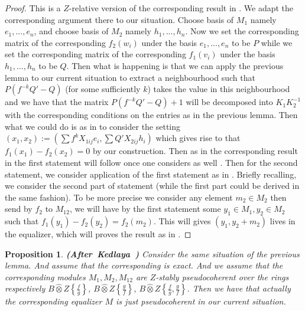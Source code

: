 \documentclass[12pt]{amsart}
\newtheorem{proposition}[theorem]{Proposition}
\theoremstyle{definition}
\numberwithin{equation}{section}
\begin{document}
\begin{proof}
This is a $Z$-relative version of the corresponding result in \cite[Lemma 1.9.10]{Ked2}. We adapt the corresponding argument there to our situation. Choose basis of $M_1$ namely $e_1,...,e_n$, and choose basis of $M_2$ namely $h_1,...,h_n$. Now we set the corresponding matrix of the corresponding $f_2(w_i)$ under the basis $e_1,...,e_n$ to be $P$ while we set the corresponding matrix of the corresponding $f_1(v_i)$ under the basis $h_1,...,h_n$ to be $Q$. Then what is happening is that we can apply the previous lemma to our current situation to extract a neighbourhood such that $P(f^{-k}Q'-Q)$ (for some sufficiently $k$) takes the value in this neighbourhood and we have that the matrix $P(f^{-k}Q'-Q)+1$ will be decomposed into $K_1K_2^{-1}$ with the corresponding conditions on the entries as in the previous lemma. Then what we could do is as in \cite[Lemma 1.9.10]{Ked2} to consider the setting $(x_1,x_2):=(\sum f^kX_{1ij}e_i,\sum Q'X_{2ij}h_i)$ which gives rise to that $f_1(x_1)-f_2(x_2)=0$ by our construction. Then as in \cite[Lemma 1.9.10]{Ked2} the corresponding result in the first statement will follow once one considers as well \cite[Lemma 1.8.1]{Ked2}. Then for the second statement, we consider application of the first statement as in \cite[Lemma 1.9.10]{Ked2}. Briefly recalling, we consider the second part of statement (while the first part could be derived in the same fashion). To be more precise we consider any element $m_2\in M_2$ then send by $f_2$ to $M_{12}$, we will have by the first statement some $y_1\in M_1,y_2\in M_2$ such that $f_1(y_1)-f_2(y_2)=f_2(m_2)$. This will gives $(y_1,y_2+m_2)$ lives in the equalizer, which will proves the result as in \cite[Lemma 1.9.10]{Ked2}. 






 	
\end{proof}






\begin{proposition} \mbox{\bf{(After Kedlaya \cite[Lemma 1.9.11]{Ked2})}} \label{lemma2.13}
Consider the same situation of the previous lemma. And assume that the corresponding \cite[1.6.15.1]{Ked2} is exact. And we assume that the corresponding modules $M_1,M_2,M_{12}$ are $Z$-stably pseudocoherent over the rings respectively $B\widehat{\otimes}Z\left\{\frac{f}{g}\right\}$, $B\widehat{\otimes}Z\left\{\frac{g}{f}\right\}$, $B\widehat{\otimes}Z\left\{\frac{f}{g},\frac{g}{f}\right\}$. Then we have that actually the corresponding equalizer $M$ is just pseudocoherent in our current situation.	
\end{proposition}
\end{document}
